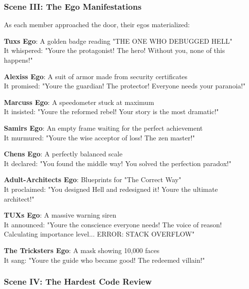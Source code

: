 \bookdivider

\subsubsection{Scene III: The Ego Manifestations}\label{scene-iii-the-ego-manifestations}

As each member approached the door, their egos materialized:

\textbf{Tux\textquotesingle s Ego}: A golden badge reading "THE ONE WHO DEBUGGED HELL"\\
It whispered: "You\textquotesingle re the protagonist! The hero! Without you, none of this happens!"

\textbf{Alexis\textquotesingle s Ego}: A suit of armor made from security certificates\\
It promised: "You\textquotesingle re the guardian! The protector! Everyone needs your paranoia!"

\textbf{Marcus\textquotesingle s Ego}: A speedometer stuck at maximum\\
It insisted: "You\textquotesingle re the reformed rebel! Your story is the most dramatic!"

\textbf{Samir\textquotesingle s Ego}: An empty frame waiting for the perfect achievement\\
It murmured: "You\textquotesingle re the wise acceptor of loss! The zen master!"

\textbf{Chen\textquotesingle s Ego}: A perfectly balanced scale\\
It declared: "You found the middle way! You solved the perfection paradox!"

\textbf{Adult-Architect\textquotesingle s Ego}: Blueprints for "The Correct Way"\\
It proclaimed: "You designed Hell and redesigned it! You\textquotesingle re the ultimate architect!"

\textbf{TUX\textquotesingle s Ego}: A massive warning siren\\
It announced: "You\textquotesingle re the conscience everyone needs! The voice of reason! Calculating importance level... ERROR: STACK OVERFLOW"

\textbf{The Trickster\textquotesingle s Ego}: A mask showing 10,000 faces\\
It sang: "You\textquotesingle re the guide who became good! The redeemed villain!"

\bookdivider

\subsubsection{Scene IV: The Hardest Code Review}\label{scene-iv-the-hardest-code-review}

